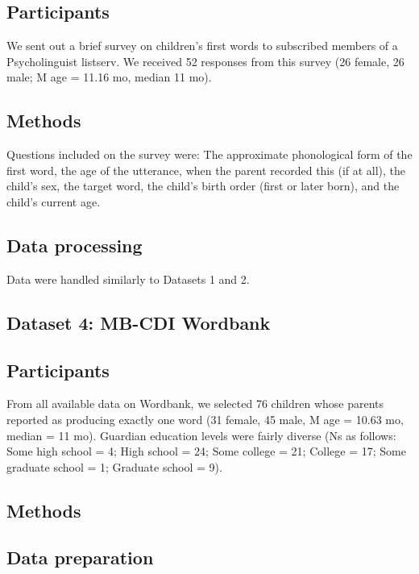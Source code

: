 \documentclass[10pt,letterpaper]{article}
\begin{document}
\subsection{Participants}
We sent out a brief survey on children's first words to subscribed members of a Psycholinguist listserv. We received 52 responses from this survey (26 female, 26 male; M age = 11.16 mo, median 11 mo).

\subsection{Methods}
Questions included on the survey were: The approximate phonological form of the first word, the age of the utterance, when the parent recorded this (if at all), the child's sex, the target word, the child's birth order (first or later born), and the child's current age. 

 \subsection{Data processing}
Data were handled similarly to Datasets 1 and 2. 

\subsection{Dataset 4: MB-CDI Wordbank}

\subsection{Participants}
From all available data on Wordbank, we selected 76 children whose parents reported as producing exactly one word (31 female, 45 male, M age = 10.63 mo, median = 11 mo). Guardian education levels were fairly diverse (Ns as follows: Some high school = 4; High school = 24; Some college = 21; College = 17; Some graduate school = 1; Graduate school = 9). 

\subsection{Methods}

\subsection{Data preparation}

\end{document}
